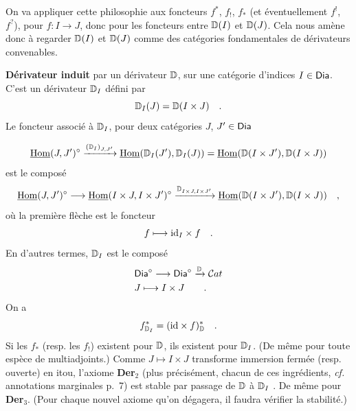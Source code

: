 On va appliquer cette philosophie aux foncteurs $f^*$, $f_!$, $f_*$ (et éventuellement $f^!$, $f^?$), pour $f : I \to J$, donc pour les foncteurs entre $\mathbb{D}(I)$ et $\mathbb{D}(J)$. Cela nous amène donc à regarder $\mathbb{D}(I)$ et $\mathbb{D}(J)$ comme des catégories fondamentales de dérivateurs convenables.

\textbf{Dérivateur induit} par un dérivateur $\mathbb{D}$, sur une catégorie d'indices $I \in \mathsf{Dia}$. C'est un dérivateur $\mathbb{D}_I$ défini par
\[
\mathbb{D}_I(J) = \mathbb{D}(I \times J) \quad .
\]
Le foncteur associé à $\mathbb{D}_I$, pour deux catégories $J$, $J' \in \mathsf{Dia}$

\[
\underline{\operatorname{Hom}}(J,J')^\circ \xrightarrow{(\mathbb{D}_I)_{J,J'}} \underline{\operatorname{Hom}}(\mathbb{D}_I(J'),\mathbb{D}_I(J)) = \underline{\operatorname{Hom}}(\mathbb{D}(I\times J'),\mathbb{D}(I\times J))
\]
est le composé
\[
\underline{\operatorname{Hom}}(J,J')^\circ \longrightarrow \underline{\operatorname{Hom}}(I\times J, I\times J')^\circ \xrightarrow{\mathbb{D}_{I\times J,I\times J'}} \underline{\operatorname{Hom}}(\mathbb{D}(I\times J'),\mathbb{D}(I\times J)) \quad ,
\]
où la première flèche est le foncteur
\[
f \longmapsto \mathrm{id}_I \times f \quad .
\]
En d'autres termes, $\mathbb{D}_I$ est le composé
\[
\begin{aligned}
&\mathsf{Dia}^\circ \longrightarrow \mathsf{Dia}^\circ \xrightarrow{\mathbb{D}} \mathcal{C}at \\
&J \longmapsto I \times J \qquad .
\end{aligned}
\]
On a
\[
f^*_{\mathbb{D}_I} = (\mathrm{id} \times f)^*_{\mathbb{D}} \quad .
\]
Si les $f_*$ (resp. les $f_!$) existent pour $\mathbb{D}$, ils existent pour $\mathbb{D}_I$. (De même pour toute espèce de multiadjoints.) Comme $J \mapsto I \times J$ transforme immersion fermée (resp. ouverte) en itou, l'axiome \textbf{Der}$_2$ (plus précisément, chacun de ces ingrédients, \textit{cf.} annotations marginales p.~7) est stable par passage de $\mathbb{D}$ à $\mathbb{D}_I$ . De même pour \textbf{Der}$_3$. (Pour chaque nouvel axiome qu'on dégagera, il faudra vérifier la stabilité.)



